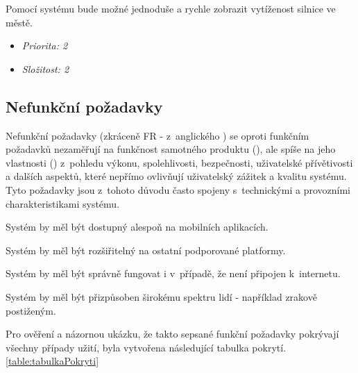 Pomocí systému bude možné jednoduše a rychle zobrazit vytíženost silnice ve městě.

\begin{itemize}
  \item \textit{Priorita: 2}
  \item \textit{Složitost: 2}
\end{itemize}

\subsection{Nefunkční požadavky}
Nefunkční požadavky (zkráceně FR - z~anglického ) se oproti funkčním požadavků nezaměřují na funkčnost samotného produktu (),
ale spíše na jeho vlastnosti () z~pohledu
výkonu, spolehlivosti, bezpečnosti, uživatelské přívětivosti a dalších aspektů, které nepřímo ovlivňují uživatelský zážitek a kvalitu systému. 
Tyto požadavky jsou z~tohoto důvodu často spojeny s~technickými a provozními charakteristikami systému.

Systém by měl být dostupný alespoň na mobilních aplikacích.



Systém by měl být rozšiřitelný na ostatní podporované platformy. %

Systém by měl být správně fungovat i v~případě, že není připojen k~internetu.

Systém by měl být přizpůsoben širokému spektru lidí - například zrakově postiženým.


Pro ověření a názornou ukázku, že takto sepsané funkční požadavky pokrývají všechny případy užití, 
byla vytvořena následující tabulka pokrytí. \ref{table:tabulkaPokryti}

